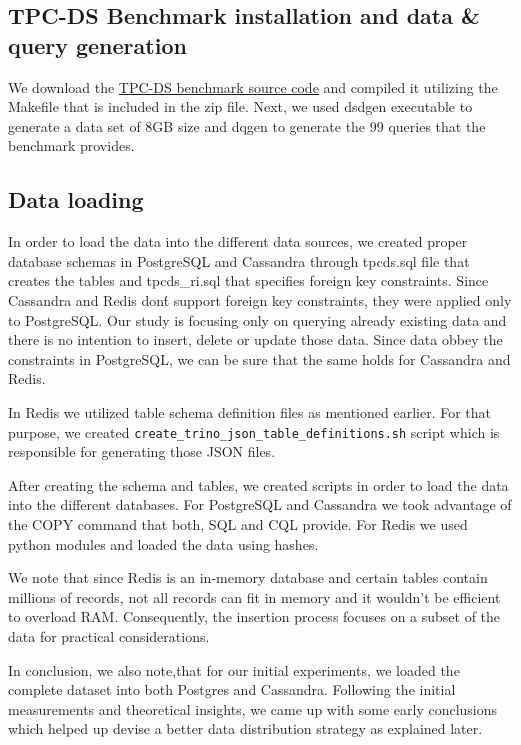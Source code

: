 \documentclass[conference]{IEEEtran}
\begin{document}
\subsection{TPC-DS Benchmark installation and data \& query generation}

We download the \textcolor{linkblue}{\underline{\href{https://www.tpc.org/tpc_documents_current_versions/current_specifications5.asp}{TPC-DS benchmark source code}}} and compiled it
utilizing the Makefile that is included in the zip file. Next, we used dsdgen executable to generate a data set of 8GB size and dqgen to generate the 99 queries that the benchmark provides.

\subsection{Data loading}

In order to load the data into the different data sources, we created proper database schemas in PostgreSQL and Cassandra through 
tpcds.sql file that creates the tables and tpcds\_ri.sql that specifies foreign key constraints. Since Cassandra and Redis don\'t support foreign key constraints, they were applied only to PostgreSQL. Our 
study is focusing only on querying already existing data and there is no intention to insert, delete or update those data. Since data obbey the constraints in PostgreSQL, we can be sure that the same holds
for Cassandra and Redis.

In Redis we utilized table schema definition files as mentioned earlier. For that purpose, we created \texttt{create\_trino\_json\_table\_definitions.sh} script which is responsible for generating those JSON files.

After creating the schema and tables, we created scripts in order to load the data into the different databases. For PostgreSQL and Cassandra we took advantage of the COPY command that both, SQL and CQL provide.
For Redis we used python modules and loaded the data using hashes.

We note that since Redis is an in-memory database and certain tables contain millions of records, not all records can fit in memory and it wouldn't be efficient to overload RAM. Consequently, the insertion process
focuses on a subset of the data for practical considerations.

In conclusion, we also note,that for our initial experiments, we loaded the complete dataset into both Postgres and Cassandra. Following the initial measurements and theoretical insights, we came up with some early conclusions 
which helped up devise a better data distribution strategy as explained later.
\end{document}
